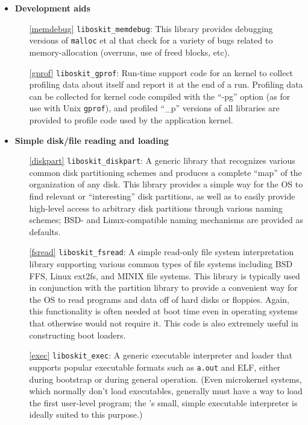 \begin{itemize}
\item {\bf Development aids}
\begin{itemize}
\item[\ref{memdebug}]	{\tt liboskit_memdebug}:
	This library provides debugging versions of {\tt malloc} et al that
	check for a variety of bugs related to memory-allocation (overruns,
	use of freed blocks, etc).

\item[\ref{gprof}]	{\tt liboskit_gprof}:
	Run-time support code for an \oskit{} kernel to collect profiling
	data about itself and report it at the end of a run.  Profiling
	data can be collected for kernel code compiled with the ``-pg''
	option (as for use with Unix {\tt gprof}),
	and profiled ``_p'' versions of all \oskit{} libraries are provided
	to profile \oskit{} code used by the application kernel.
\end{itemize}


\item {\bf Simple disk/file reading and loading}
\begin{itemize}
\item[\ref{diskpart}]	{\tt liboskit_diskpart}:
	A generic library
	that recognizes various common disk partitioning schemes
	and produces a complete ``map'' of the organization of any disk.
	This library provides a simple way for the OS
	to find relevant or ``interesting'' disk partitions,
	as well as to easily provide high-level access
	to arbitrary disk partitions through various naming schemes;
	BSD- and Linux-compatible naming mechanisms are provided as defaults.

\item[\ref{fsread}]	{\tt liboskit_fsread}:
	A simple read-only file system interpretation library
	supporting various common types of file systems
	including BSD FFS, Linux ext2fs, and MINIX file systems.
	This library is typically used
	in conjunction with the partition library
	to provide a convenient way for the OS
	to read programs and data off of hard disks or floppies.
	Again, this functionality is often needed at boot time
	even in operating systems that otherwise would not require it.
	This code is also extremely useful in constructing boot loaders.

\item[\ref{exec}]	{\tt liboskit_exec}:
	A generic executable interpreter and loader
	that supports popular executable formats such as {\tt a.out} and ELF,
	either during bootstrap or during general operation.
	(Even microkernel systems,
	which normally don't load executables,
	generally
	must have a way to load the first user-level program;
	the \oskit{}'s small, simple executable interpreter
	is ideally suited to this purpose.)
\end{itemize}



\end{itemize}
